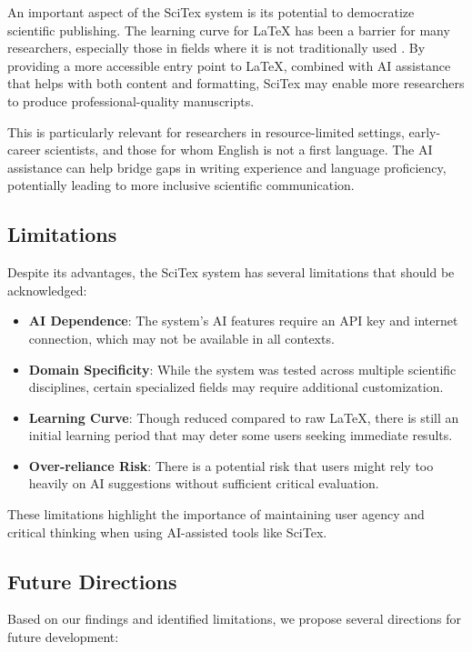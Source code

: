 An important aspect of the SciTex system is its potential to democratize scientific publishing. The learning curve for LaTeX has been a barrier for many researchers, especially those in fields where it is not traditionally used \cite{kim2019adoption}. By providing a more accessible entry point to LaTeX, combined with AI assistance that helps with both content and formatting, SciTex may enable more researchers to produce professional-quality manuscripts.

This is particularly relevant for researchers in resource-limited settings, early-career scientists, and those for whom English is not a first language. The AI assistance can help bridge gaps in writing experience and language proficiency, potentially leading to more inclusive scientific communication.

\subsection{Limitations}

Despite its advantages, the SciTex system has several limitations that should be acknowledged:

\begin{itemize}
    \item \textbf{AI Dependence}: The system's AI features require an API key and internet connection, which may not be available in all contexts.
    \item \textbf{Domain Specificity}: While the system was tested across multiple scientific disciplines, certain specialized fields may require additional customization.
    \item \textbf{Learning Curve}: Though reduced compared to raw LaTeX, there is still an initial learning period that may deter some users seeking immediate results.
    \item \textbf{Over-reliance Risk}: There is a potential risk that users might rely too heavily on AI suggestions without sufficient critical evaluation.
\end{itemize}

These limitations highlight the importance of maintaining user agency and critical thinking when using AI-assisted tools like SciTex.

\subsection{Future Directions}

Based on our findings and identified limitations, we propose several directions for future development:

